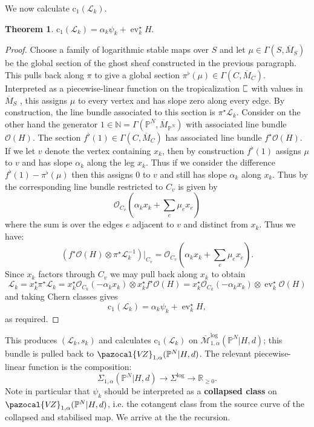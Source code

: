 \documentclass[11pt]{amsart}
\newcommand{\sqC}{\scalebox{0.8}[1.3]{$\sqsubset$}}
\newcommand{\MLog}{\overline{\mathcal{M}}^{\operatorname{log}}}
\newcommand{\PP}{\mathbb P}
\newcommand{\VZ}{\pazocal{V\!Z}}
\newcommand{\st}{\star}
\newcommand{\N}{\mathbb{N}}
\newcommand{\OO}{\mathcal{O}}
\renewcommand{\to}{\rightarrow}
\newcommand{\ev}{\operatorname{ev}}
\newcommand{\Lcal}{\mathcal{L}}
\newcommand{\cchern}{\mathrm{c}}
\newcommand{\ol}[1]{\overline{#1}}
\newcommand{\RR}{\mathbb{R}}
\theoremstyle{definition}
\newtheorem{thm}{Theorem}[section]
\theoremstyle{definition}
\begin{document}
We now calculate $\cchern_1(\Lcal_k)$. 
\begin{thm} $\cchern_1(\Lcal_k) = \alpha_k \psi_k + \ev_k^\st H.$\end{thm}
\begin{proof}
Choose a family of logarithmic stable maps over $S$ and let $\mu \in \Gamma(S,\ol{M}_S)$ be the global section of the ghost sheaf constructed in the previous paragraph. This pulls back along $\pi$ to give a global section $\pi^\flat(\mu) \in \Gamma(C,\ol{M}_C)$.  Interpreted as a piecewise-linear function on the tropicalization $\sqC$ with values in $\ol{M}_S$ \cite[Remark 7.3]{CavalieriChanUlirschWise}, this assigns $\mu$ to every vertex and has slope zero along every edge. By construction, the line bundle associated to this section is $\pi^\st \Lcal_k$. Consider on the other hand the generator $1 \in \N = \Gamma(\PP^N,\ol{M}_{\PP^N})$ with associated line bundle $\OO(H)$. The section $f^\flat(1) \in \Gamma(C,\ol{M}_C)$ has associated line bundle $f^\st\OO(H)$. If we let $v$ denote the vertex containing $x_k$, then by construction $f^\flat(1)$ assigns $\mu$ to $v$ and has slope $\alpha_k$ along the leg $x_k$. Thus if we consider the difference $f^\flat(1) - \pi^\flat(\mu)$ then this assigns $0$ to $v$ and still has slope $\alpha_k$ along $x_k$. Thus by \cite[Proposition 2.4.1]{RSPW} the corresponding line bundle restricted to $C_v$ is given by
\begin{equation*} \OO_{C_v} \left(\alpha_k x_k + \sum_e \mu_e x_e \right) \end{equation*}
where the sum is over the edges $e$ adjacent to $v$ and distinct from $x_k$. Thus we have:
\begin{equation*} \left( f^\st\OO(H) \otimes \pi^\st \Lcal_k^{-1} \right) \big|_{C_v} = \OO_{C_v} \left(\alpha_k x_k + \sum_e \mu_e x_e \right).\end{equation*}
Since $x_k$ factors through $C_v$ we may pull back along $x_k$ to obtain
\begin{equation*} \Lcal_k = x_k^\st\pi^\st \Lcal_k = x_k^\st \OO_{C_k}(-\alpha_k x_k) \otimes x_k^\st f^\st\OO(H) = x_k^\st \OO_{C_k}(-\alpha_k x_k) \otimes \ev_k^\st \OO(H) \end{equation*}
and taking Chern classes gives
\begin{equation*} \cchern_1(\Lcal_k) = \alpha_k \psi_k + \ev_k^\st H,\end{equation*}
as required.\end{proof}
This produces $(\Lcal_k,s_k)$ and calculates $\cchern_1(\Lcal_k)$ on $\MLog_{1,\alpha}(\PP^N|H,d)$; this bundle is pulled back to $\VZ_{1,\alpha}(\PP^N|H,d)$. The relevant piecewise-linear function is the composition:
\begin{equation*} \Sigma_{1,\alpha}(\PP^N|H,d) \to \Sigma^{\log} \to \RR_{\geq 0}.\end{equation*}
Note in particular that $\psi_k$ should be interpreted as a \textbf{collapsed class} on $\VZ_{1,\alpha}(\PP^N|H,d)$, i.e. the cotangent class from the source curve of the collapsed and stabilised map. We arrive at the the recursion. 
\end{document}
